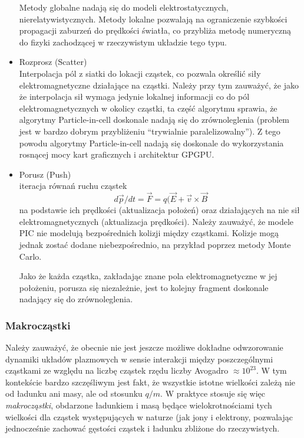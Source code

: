 \begin{itemize}
    Metody globalne nadają się do modeli elektrostatycznych,
    nierelatywistycznych.  Metody lokalne pozwalają na ograniczenie szybkości
    propagacji zaburzeń do prędkości światła, co przybliża metodę numeryczną do
    fizyki zachodzącej w rzeczywistym układzie tego typu.
    \item Rozprosz (Scatter) \\
    Interpolacja pól z siatki do lokacji cząstek, co pozwala określić siły
    elektromagnetyczne działające na cząstki.  Należy przy tym zauważyć, że
    jako że interpolacja sił wymaga jedynie lokalnej informacji co do pól
    elektromagnetycznych w okolicy cząstki, ta część algorytmu sprawia, że
    algorytmy Particle-in-cell doskonale nadają się do zrównoleglenia (problem
    jest w bardzo dobrym przybliżeniu ``trywialnie paralelizowalny''). Z tego
    powodu algorytmy Particle-in-cell nadają się doskonale do wykorzystania
    rosnącej mocy kart graficznych i architektur GPGPU.
    \item Porusz (Push) \\
    iteracja równań ruchu cząstek
    \begin{equation}
        d \vec{p}/dt = \vec{F} = q (\vec{E} + \vec{v} \times \vec{B}
        \label{eq-of-motion}
    \end{equation}
    na podstawie ich prędkości (aktualizacja położeń) oraz działających na nie
    sił elektromagnetycznych (aktualizacja prędkości). Należy zauważyć, że
    modele PIC nie modelują bezpośrednich kolizji między cząstkami. Kolizje
    mogą jednak zostać dodane niebezpośrednio, na przykład poprzez metody Monte
    Carlo. 

    Jako że każda cząstka, zakładając znane pola elektromagnetyczne w jej
    położeniu, porusza się niezależnie, jest to kolejny fragment doskonale
    nadający się do zrównoleglenia.
    \end{itemize}
    \subsubsection{Makrocząstki}
    Należy zauważyć, że obecnie nie jest jeszcze możliwe dokładne odwzorowanie
    dynamiki układów plazmowych w sensie interakcji między poszczególnymi
    cząstkami ze względu na liczbę cząstek rzędu liczby Avogadro $\approx
    10^{23}$.  W tym kontekście bardzo szczęśliwym jest fakt, że wszystkie
    istotne wielkości zależą nie od ładunku ani masy, ale od stosunku $q/m$. W
    praktyce stosuje się więc \emph{makrocząstki}, obdarzone ładunkiem i masą
    będące wielokrotnościami tych wielkości dla cząstek występujących w naturze
    (jak jony i elektrony, pozwalając jednocześnie zachować gęstości cząstek i
    ładunku zbliżone do rzeczywistych.

